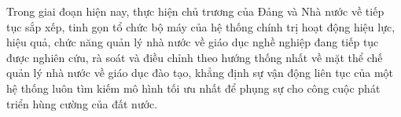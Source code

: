 Trong giai đoạn hiện nay, thực hiện chủ trương của Đảng và Nhà nước về tiếp tục sắp xếp, tinh gọn tổ chức bộ máy của hệ thống chính trị hoạt động hiệu lực, hiệu quả, chức năng quản lý nhà nước về giáo dục nghề nghiệp đang tiếp tục được nghiên cứu, rà soát và điều chỉnh theo hướng thống nhất về mặt thể chế quản lý nhà nước về giáo dục đào tạo, khẳng định sự vận động liên tục của một hệ thống luôn tìm kiếm mô hình tối ưu nhất để phụng sự cho công cuộc phát triển hùng cường của đất nước.
